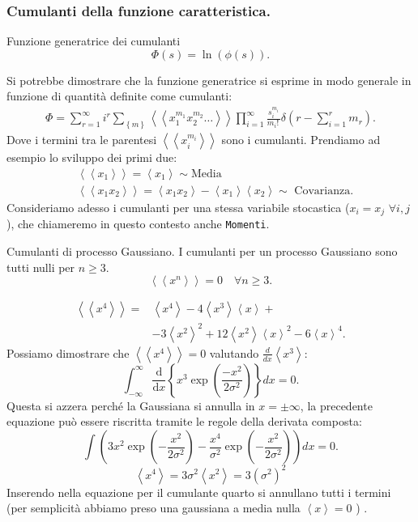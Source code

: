 \subsubsection{Cumulanti della funzione caratteristica.}%
\label{sub:Sviluppo in cumulanti di phi}
\begin{redbox}{Funzione generatrice dei cumulanti}
   \[
       \Phi(s) = \ln (\phi (s) ) 
   .\]  
\end{redbox}
\noindent
Si potrebbe dimostrare che la funzione generatrice si esprime in modo generale in funzione di quantità definite come cumulanti:
\[\begin{aligned}
    \Phi = \sum_{r=1}^{\infty} i^r \sum_{\left\{m\right\}}^{} 
    \left<\left< x_1^{m_1}x_2^{m_2}\ldots\right>\right> 
    \prod_{i=1}^{\infty} \frac{s_i^{m_i}}{m_i!\,}\delta (r-\sum_{i=1}^{r} m_r) 
.\end{aligned}\]
Dove i termini tra le parentesi $\left<\left< x_i^{m_i}\right>\right>$ sono i cumulanti. Prendiamo ad esempio lo sviluppo dei primi due:
\[\begin{aligned}
    & \left<\left<x_1\right>\right> = \left<x_1\right> \sim \text{Media}\\
    & \left<\left<x_1 x_2 \right>\right> = \left<x_1x_2\right> - \left<x_1\right>\left<x_2\right> \sim \text{ Covarianza}
.\end{aligned}\]
Consideriamo adesso i cumulanti per una stessa variabile stocastica ($x_i = x_j $ $\forall i, j$), che chiameremo in questo contesto anche \texttt{Momenti}.
\begin{greenbox}{Cumulanti di processo Gaussiano.}
   I cumulanti per un processo Gaussiano sono tutti nulli per $n\ge 3$.
   \[
       \left<\left<x^n\right>\right> = 0 \quad \forall n \ge  3
   .\] 
\end{greenbox}
\begin{exmp}
    \[\begin{aligned}
	\left<\left<x^4\right>\right> =& \left<x^4\right>-4\left<x^3\right>\left<x\right>+\\
					&-3\left<x^2\right>^2 + 12\left<x^2\right>\left<x\right>^2-6\left<x\right>^4
    .\end{aligned}\]
    Possiamo dimostrare che $\left<\left<x^4\right>\right> = 0$ valutando $\frac{d}{dx}\left<x^3\right>$:
    \[
        \int_{-\infty}^{\infty} \frac{\text{d} }{\text{d} x} \left\{x^3 \exp\left(\frac{-x^2}{2\sigma^2}\right)\right\} dx = 0 
    .\] 
    Questa si azzera perché la Gaussiana si annulla in $x = \pm \infty$, la precedente equazione può essere riscritta tramite le regole della derivata composta:
    \[
        \int\left(3x^2\exp\left(-\frac{x^2}{2\sigma^2}\right) - 
		\frac{x^4}{\sigma^2}\exp\left(- \frac{x^2}{2\sigma^2}\right) \right)dx = 0 
    .\] 
    \begin{equation}
 	\left<x^4\right> = 3\sigma^2\left<x^2\right> = 3 \left(\sigma^2\right)^2
	\label{eq:cum4_gauss}
    \end{equation}
    Inserendo nella equazione per il cumulante quarto si annullano tutti i termini (per semplicità abbiamo preso una gaussiana a media nulla $\left<x\right>=0$ ) .
\end{exmp}
